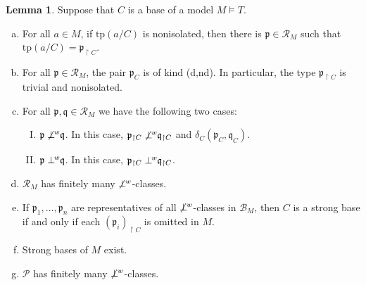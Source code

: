 \documentclass{amsart}
\theoremstyle{definition}
\newtheorem{Lemma}[Theorem]{Lemma}
\theoremstyle{definition}
\def\strok{\restriction}
\newcommand{\wor}{\perp\hspace*{-0.4em}^{\mathit w}}
\newcommand{\nwor}{\not\perp\hspace*{-0.4em}^{\mathit w}}
\newcommand{\tp}{\mathrm{tp}}
\begin{document}
\begin{Lemma}\label{Lemma ALMOST sva priprema}
Suppose that $C$ is a base of a model $M\models T$.
    \begin{enumerate}[(a)]
        \item For all $a\in M$, if $\tp(a/C)$ is nonisolated, then there is $\mathfrak p\in\mathcal R_M$ such that $\tp(a/C)=\mathfrak p_{\strok C}$.
        \item For all $\mathfrak p\in\mathcal R_M$, the pair $\mathfrak p_C$ is of kind (d,nd). In particular, the type $\mathfrak p_{\strok C}$ is trivial and nonisolated.
        \item For all $\mathfrak p,\mathfrak q\in\mathcal R_M$ we have the following two cases:
\begin{enumerate}[(I)]
        \item $\mathfrak p\nwor\mathfrak q$. In this case, $\mathfrak p_{\strok C}\nwor\mathfrak q_{\strok C}$ and $\delta_C(\mathfrak p_C,\mathfrak q_C)$.
        
        \item $\mathfrak p\wor\mathfrak q$. In this case, $\mathfrak p_{\strok C}\wor\mathfrak q_{\strok C}$. 
\end{enumerate} 
        \item $\mathcal R_M$ has finitely many $\nwor$-classes. 
        \item If $\mathfrak p_1,\dots,\mathfrak p_n$ are representatives of all $\nwor$-classes in $\mathcal B_M$, then $C$ is a strong base if and only if each $(\mathfrak p_i)_{\strok C}$ is omitted in $M$.
        \item Strong bases of $M$ exist.
        \item $\mathcal P$ has finitely many $\nwor$-classes. 
    \end{enumerate}
\end{Lemma} 
\end{document}

